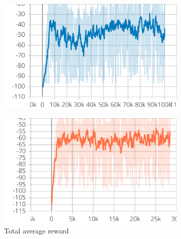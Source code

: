 \begin{figure}[t]
\begin{subfigure}[b]{0.32\textwidth}
    \end{subfigure}
    \hfill
    \begin{subfigure}[b]{0.32\textwidth}
        \centering
        \includegraphics[width=\textwidth]{papers/coordination2023/imgs/cohesion-ctde.pdf}
    \end{subfigure}
    \par\bigskip
    \begin{subfigure}[b]{0.32\textwidth}
        \centering
        \includegraphics[width=\textwidth]{papers/coordination2023/imgs/reward-dtde.pdf}
        \caption{Total average reward}
        \label{fig:reward-dcc}
    \end{subfigure}
    \hfill
    \begin{subfigure}[b]{0.32\textwidth}
        \centering

\end{subfigure}
\end{figure}
